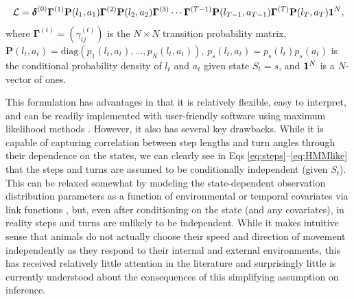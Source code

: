 \documentclass[12pt]{article}\usepackage[]{graphicx}\usepackage[]{xcolor}
\begin{document}
\begin{equation}
  \mathcal{L}={\boldsymbol \delta}^{(0)} {\mathbf \Gamma}^{(1)} {\mathbf P}(l_1,a_1) {\mathbf \Gamma}^{(2)} {\mathbf P}(l_2,a_2) {\mathbf \Gamma}^{(3)} \cdots {\mathbf \Gamma}^{(T-1)} {\mathbf P}(l_{T-1},a_{T-1}) {\mathbf \Gamma}^{(T)} {\mathbf P}(l_T,a_T) {\bf 1}^N,
  \label{eq:HMMlike}
\end{equation}
where ${\mathbf \Gamma}^{(t)}=\left(\gamma_{ij}^{(t)} \right)$ is the $N \times N$ transition probability matrix, ${\mathbf P}(l_t,a_t)=\text{diag}(p_1(l_t,a_t), \ldots, p_N(l_t,a_t))$, $p_s(l_t,a_t)=p_s(l_t) p_s(a_t)$ is the conditional probability density of $l_t$ and $a_t$ given state $S_t=s$, and ${\bf 1}^N$ is a $N$-vector of ones. %

This formulation has advantages in that it is relatively flexible, easy to interpret, and can be readily implemented with user-friendly software using maximum likelihood methods \citep[e.g.,][]{MichelotEtAl2016,McClintockMichelot2018}. However, it also has several key drawbacks. While it is capable of capturing correlation between step lengths and turn angles through their dependence on the states, we can clearly see in Eqs \ref{eq:steps}--\ref{eq:HMMlike} that the steps and turns are assumed to be conditionally independent (given $S_t$). This can be relaxed somewhat by modeling the state-dependent observation distribution parameters as a function of environmental or temporal covariates via link functions \citep[e.g.,][]{McClintockEtAl2012,rivest2016general}, but, even after conditioning on the state (and any covariates), in reality steps and turns are unlikely to be independent. While it makes intuitive sense that animals do not actually choose their speed and direction of movement independently as they respond to their internal and external environments, this has received relatively little attention in the literature \citep[but see][]{hodel2022circular} and surprisingly little is currently understood about the consequences of this simplifying assumption on inference. 
\end{document}
